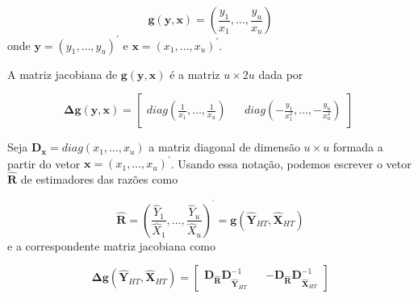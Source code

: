 \documentclass[
  12pt,
  brazilian,
]{book}
\theoremstyle{definition}
\theoremstyle{definition}
\theoremstyle{definition}
\theoremstyle{definition}
\theoremstyle{remark}
\begin{document}
\[
\mathbf{g}\left( \mathbf{y},\mathbf{x}\right) =\left( \frac{y_{1}}{x_{1}},\ldots ,\frac{y_{u}}{x_{u}}\right) 
\]
onde \(\mathbf{y=}\left( y_{1},\ldots ,y_{u}\right) ^{\prime }\) e \(\mathbf{x=}\left( x_{1},\ldots,x_{u}\right) ^{\prime }\).

A matriz jacobiana de \(\mathbf{g}\left( \mathbf{y},\mathbf{x}\right)\) é a matriz \(u\times 2u\) dada por

\[
\mathbf{\Delta g}\left( \mathbf{y},\mathbf{x}\right) = \left[ 
\begin{array}{lll}
 diag \left( \frac{1}{x_{1}}, \ldots, \frac{1}{x_{u}} \right) &  & diag\left( -\frac{y_{1}}{x_{1}^{2}}, \ldots, -\frac{y_{u}}{x_{u}^{2}} \right)
\end{array}
\right] \,\,
\]

Seja \(\mathbf{D}_{\mathbf{x}}=diag(x_{1},\ldots ,x_{u})\) a matriz diagonal
de dimensão \(u \times u\) formada a partir do vetor \(\mathbf{x=}\left( x_{1}, \ldots, x_{u}\right) ^{\prime}\). Usando essa notação, podemos escrever o vetor \(\widehat{\mathbf{R}}\) de estimadores das razões como

\[
\widehat{\mathbf{R}}\mathbf{=}\left( \frac{\hat{Y}_{1 }}{\hat{X}_{1 }},\ldots ,\frac{\hat{Y}_{u }}{\hat{X}_{u }}\right) ^{^{\prime }}=\mathbf{g}\left( \mathbf{\hat{Y}}_{HT},\mathbf{\hat{X}}_{HT}\right)
\]
e a correspondente matriz jacobiana como

\[
\mathbf{\Delta g}\left( \mathbf{\hat{Y}}_{HT},\mathbf{\hat{X}}_{HT} \right) = \left[ \begin{array}{lll}
\mathbf{\mathbf{D}_{\widehat{\mathbf{R}}}D}_{\mathbf{\hat{Y}}_{HT}}^{-1} &\left. {}\right. & \mathbf{-\mathbf{D}_{\widehat{\mathbf{R}}}D}_{\mathbf{\hat{X}}_{HT}}^{-1}
\end{array}
\right] 
\]
\end{document}
